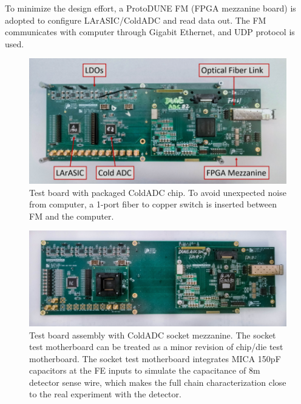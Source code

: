 To minimize the design effort, a ProtoDUNE FM (FPGA mezzanine board) is adopted to configure LArASIC/ColdADC and read data out.  The FM communicates with computer through Gigabit Ethernet, and UDP protocol is used.
\begin{figure}[!ht]
\centering
 \includegraphics[width=0.85\linewidth]{figures/BNL_testbd1.png}
  \caption{Test board with packaged ColdADC chip. To avoid unexpected noise from computer, a 1-port fiber to copper switch is inserted between FM and the computer.}
  \label{fig:bnl_testbd1}
\end{figure}
\begin{figure}[!ht]
\centering
 \includegraphics[width=0.85\linewidth]{figures/BNL_testbd2.png}
  \caption{Test board assembly with ColdADC socket mezzanine. The socket test motherboard can be treated as a minor revision of chip/die test motherboard. The socket test motherboard integrates MICA 150pF capacitors at the FE inputs to simulate the capacitance of 8m detector sense wire, which makes the full chain characterization close to the real experiment with the detector.}
  \label{fig:bnl_testbd2}
\end{figure}

